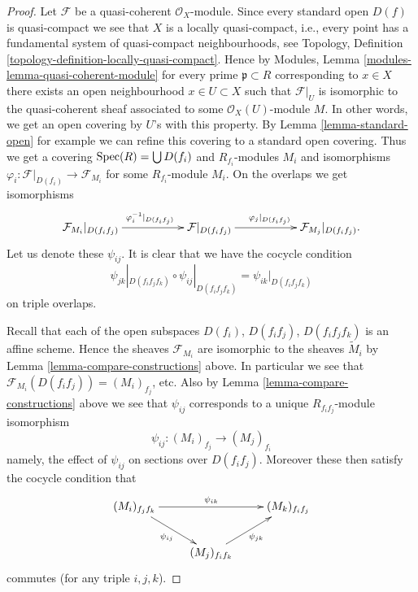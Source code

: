 \begin{proof}
Let $\mathcal{F}$ be a quasi-coherent $\mathcal{O}_X$-module.
Since every standard open $D(f)$ is quasi-compact we see that
$X$ is a locally quasi-compact, i.e., every point has a fundamental
system of quasi-compact neighbourhoods, see Topology,
Definition \ref{topology-definition-locally-quasi-compact}.
Hence by Modules, Lemma \ref{modules-lemma-quasi-coherent-module}
for every prime $\mathfrak p \subset R$ corresponding to $x \in X$
there exists an open neighbourhood $x \in U \subset X$ such that
$\mathcal{F}|_U$ is isomorphic to the quasi-coherent
sheaf associated to some $\mathcal{O}_X(U)$-module $M$.
In other words, we get an open covering by $U$'s with this property.
By Lemma \ref{lemma-standard-open} for example we can refine this
covering to  a standard open covering.
Thus we get a covering $\mathop{\rm Spec}(R) = \bigcup D(f_i)$
and $R_{f_i}$-modules $M_i$ and isomorphisms
$\varphi_i : \mathcal{F}|_{D(f_i)} \to \mathcal{F}_{M_i}$
for some $R_{f_i}$-module $M_i$. On the overlaps
we get isomorphisms
$$
\xymatrix{
\mathcal{F}_{M_i}|_{D(f_if_j)}
\ar[rr]^{\varphi_i^{-1}|_{D(f_if_j)}}
& &
\mathcal{F}|_{D(f_if_j)}
\ar[rr]^{\varphi_j|_{D(f_if_j)}}
& &
\mathcal{F}_{M_j}|_{D(f_if_j)}.
}
$$
Let us denote these $\psi_{ij}$. It is clear that
we have the cocycle condition
$$
\psi_{jk}|_{D(f_if_jf_k)}
\circ
\psi_{ij}|_{D(f_if_jf_k)}
=
\psi_{ik}|_{D(f_if_jf_k)}
$$
on triple overlaps.

\medskip\noindent
Recall that each of the open subspaces $D(f_i)$, $D(f_if_j)$,
$D(f_if_jf_k)$ is an affine scheme. Hence the sheaves $\mathcal{F}_{M_i}$
are isomorphic to the sheaves $\widetilde M_i$ by Lemma
\ref{lemma-compare-constructions} above. In particular we see that
$\mathcal{F}_{M_i}(D(f_if_j)) = (M_i)_{f_j}$, etc.
Also by Lemma \ref{lemma-compare-constructions} above we see
that $\psi_{ij}$ corresponds to a unique $R_{f_if_j}$-module isomorphism
$$
\psi_{ij} : (M_i)_{f_j} \longrightarrow (M_j)_{f_i}
$$
namely, the effect of $\psi_{ij}$ on sections over $D(f_if_j)$.
Moreover these then satisfy the cocycle condition that
$$
\xymatrix{
(M_i)_{f_jf_k}
\ar[rd]_{\psi_{ij}}
\ar[rr]^{\psi_{ik}}
& &
(M_k)_{f_if_j} \\
&
(M_j)_{f_if_k} \ar[ru]_{\psi_{jk}}
}
$$
commutes (for any triple $i, j, k$).


\end{proof}
